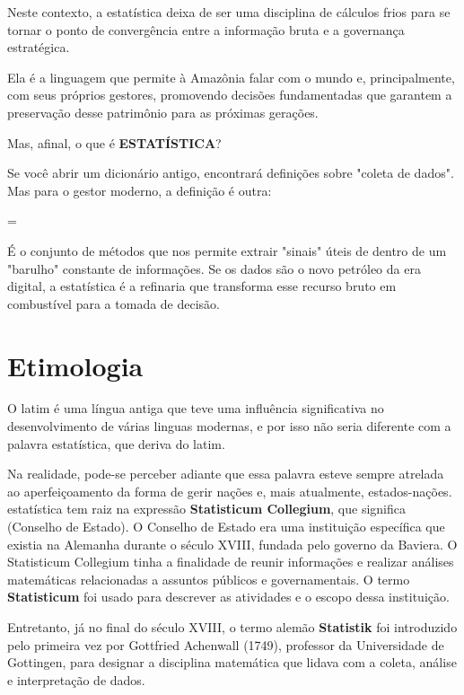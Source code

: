 Neste contexto, a estatística deixa de ser uma disciplina de cálculos frios para se tornar o ponto de convergência entre a informação bruta e a governança estratégica. \vskip0.3cm

Ela é a linguagem que permite à Amazônia falar com o mundo e, principalmente, com seus próprios gestores, promovendo decisões fundamentadas que garantem a preservação desse patrimônio para as próximas gerações.  \vskip0.3cm


Mas, afinal, o que é \textbf{ESTATÍSTICA}?
\vskip0.3cm

Se você abrir um dicionário antigo, encontrará definições sobre "coleta de dados". Mas para o gestor moderno, a definição é outra: \vskip0.3cm

\begin{center}
 = 
\end{center}

É o conjunto de métodos que nos permite extrair "sinais" úteis de dentro de um "barulho" constante de informações. Se os dados são o novo petróleo da era digital, a estatística é a refinaria que transforma esse recurso bruto em combustível para a tomada de decisão.

\newpage
\section{Etimologia}

O latim é uma língua antiga que teve uma influência significativa no desenvolvimento de várias linguas modernas, e por isso não seria diferente com a palavra estatística, que deriva do latim. 
\vskip0.3cm

Na realidade, pode-se perceber adiante que essa palavra esteve sempre atrelada ao aperfeiçoamento da forma de gerir nações e, mais atualmente, estados-nações. estatística tem raiz na expressão \textbf{Statisticum Collegium}, que significa  (Conselho de Estado). O Conselho de Estado era uma ins\-ti\-tui\-ção específica que existia na Alemanha durante o século XVIII, fundada pelo governo da Baviera. O Statisticum Collegium tinha a finalidade de reunir informações e realizar análises matemáticas relacionadas a assuntos públicos e governamentais. O termo \textbf{Statisticum} foi usado para descrever as atividades e o escopo dessa instituição.\vskip0.3cm

Entretanto, já no final do século XVIII, o termo alemão \textbf{Statistik} foi introduzido pelo primeira vez por Gottfried Achenwall (1749), professor da Universidade de Gottingen, para designar a disciplina matemática que lidava com a coleta, análise e interpretação de dados. 

